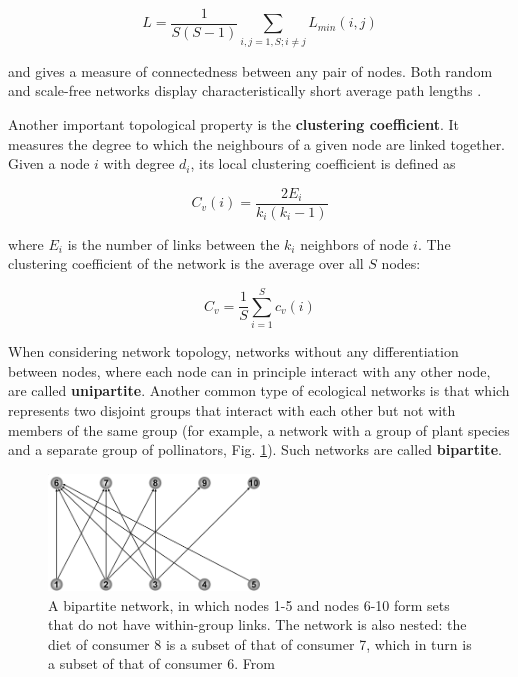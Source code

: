 \begin{equation}
L = \frac{1}{S(S-1)} \sum_{i,j=1,S;i \neq j} L_{min}(i,j)
\end{equation}

and gives a measure of connectedness between any pair of nodes. Both random and scale-free networks display characteristically short average path lengths \citep{Montoya2002}.

Another important topological property is the \textbf{clustering coefficient}. It measures the degree to which the neighbours of a given node are linked together. Given a node $i$ with degree $d_i$, its local clustering coefficient is defined as

\begin{equation}
C_v(i) = \frac{2E_i}{k_i(k_i - 1)}
\end{equation}

where $E_i$ is the number of links between the $k_i$ neighbors of node $i$. The clustering coefficient of the network is the average over all $S$ nodes:

\begin{equation}
C_v = \frac{1}{S} \sum_{i=1}^{S} c_v(i)
\end{equation}

When considering network topology, networks without any differentiation between nodes, where each node can in principle interact with any other node, are called \textbf{unipartite}. Another common type of ecological networks is that which represents two disjoint groups that interact with each other but not with members of the same group (for example, a network with a group of plant species and a separate group of pollinators, Fig. \ref{fig:bipartite_nested}). Such networks are called \textbf{bipartite}.

\begin{figure}[ht]
\centering
\includegraphics[width=0.5\textwidth]{./Figures/intro/network_theory/bipartite_nested_network_Ings2009.png}
\caption[Nested bipartite network]{\color{Gray} A bipartite network, in which nodes 1-5 and nodes 6-10 form sets that do not have within-group links. The network is also nested: the diet of consumer 8 is a subset of that of consumer 7, which in turn is a subset of that of consumer 6. From \cite{Ings2009}}
\label{fig:bipartite_nested}
\end{figure}

